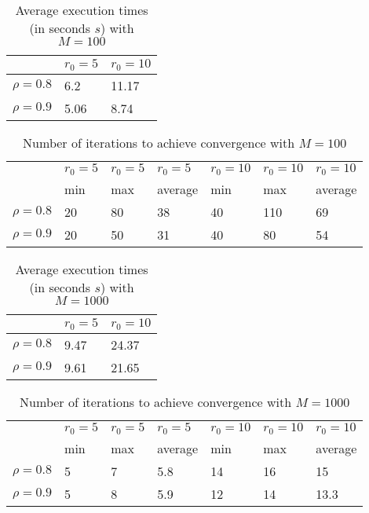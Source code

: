 \documentclass[a4paper,11pt,openright]{report}
\begin{document}
\begin{table}[H]
\centering
\addtolength{\leftskip}{-1.5cm}
\addtolength{\rightskip}{-1.5cm}
\begin{tabular}{|c|ll|}
\hline
$ $ & $r_0 = 5$ & $r_0 = 10$ \\
\hline
$\rho = 0.8$ & 6.2 & 11.17 \\
$\rho = 0.9$ & 5.06 & 8.74 \\
\hline
\end{tabular}
\caption{Average execution times (in seconds $s$) with $M = 100$}
\end{table}
\begin{table}[H]
\centering
\addtolength{\leftskip}{-1.5cm}
\addtolength{\rightskip}{-1.5cm}
\begin{tabular}{|c|llllll|}
\hline
$ $ & $r_0 = 5$ & $r_0 = 5$ & $r_0 = 5$ & $r_0 = 10$ & $r_0 = 10$ & $r_0 = 10$ \\
$ $ & min & max & average & min & max & average \\
\hline
$\rho = 0.8$ & 20 & 80 & 38 & 40 & 110 & 69 \\
$\rho = 0.9$ & 20 & 50 & 31 & 40 & 80 & 54 \\
\hline
\end{tabular}
\caption{Number of iterations to achieve convergence with $M = 100$}
\end{table}
\begin{table}[H]
\centering
\addtolength{\leftskip}{-1.5cm}
\addtolength{\rightskip}{-1.5cm}
\begin{tabular}{|c|ll|}
\hline
$ $ & $r_0 = 5$ & $r_0 = 10$ \\
\hline
$\rho = 0.8$ & 9.47 & 24.37 \\
$\rho = 0.9$ & 9.61 & 21.65 \\
\hline
\end{tabular}
\caption{Average execution times (in seconds $s$) with $M = 1000$}
\end{table}
\begin{table}[H]
\centering
\addtolength{\leftskip}{-1.5cm}
\addtolength{\rightskip}{-1.5cm}
\begin{tabular}{|c|llllll|}
\hline
$ $ & $r_0 = 5$ & $r_0 = 5$ & $r_0 = 5$ & $r_0 = 10$ & $r_0 = 10$ & $r_0 = 10$ \\
$ $ & min & max & average & min & max & average \\
\hline
$\rho = 0.8$ & 5 & 7 & 5.8 & 14 & 16 & 15 \\
$\rho = 0.9$ & 5 & 8 & 5.9 & 12 & 14 & 13.3 \\
\hline
\end{tabular}
\caption{Number of iterations to achieve convergence with $M = 1000$}
\end{table}
\newpage
\end{document}
